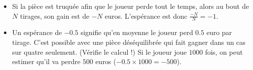 \documentclass[11pt,class=report,crop=false]{standalone}
\begin{document}
\begin{cours}
\begin{itemize}
\begin{itemize}
    \item Si la pièce est truquée afin que le joueur perde tout le temps, alors au bout de $N$ tirages, son gain est de $-N$ euros. L'espérance est donc $\frac{-N}{N}=-1$.
    
    \item Un espérance de $-0.5$ signifie qu'en moyenne le joueur perd $0.5$ euro par tirage. C'est possible avec une pièce déséquilibrée qui fait gagner dans un cas sur quatre seulement. (Vérifie le calcul !) Si le joueur joue $1000$ fois, on peut estimer qu'il va perdre $500$ euros ($-0.5 \times 1000 = -500$).
 \end{itemize}     
\end{itemize}

\end{cours}


\end{document}
